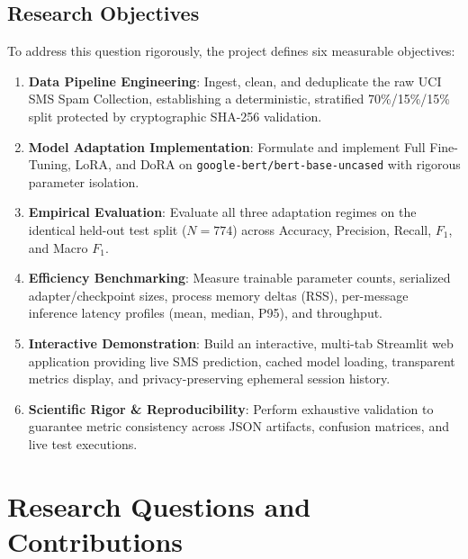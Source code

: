 \documentclass[conference]{IEEEtran}
\begin{document}
\subsection{Research Objectives}
To address this question rigorously, the project defines six measurable objectives:
\begin{enumerate}
    \item \textbf{Data Pipeline Engineering}: Ingest, clean, and deduplicate the raw UCI SMS Spam Collection, establishing a deterministic, stratified 70\%/15\%/15\% split protected by cryptographic SHA-256 validation.
    \item \textbf{Model Adaptation Implementation}: Formulate and implement Full Fine-Tuning, LoRA, and DoRA on \texttt{google-bert/bert-base-uncased} with rigorous parameter isolation.
    \item \textbf{Empirical Evaluation}: Evaluate all three adaptation regimes on the identical held-out test split ($N=774$) across Accuracy, Precision, Recall, $F_1$, and Macro $F_1$.
    \item \textbf{Efficiency Benchmarking}: Measure trainable parameter counts, serialized adapter/checkpoint sizes, process memory deltas (RSS), per-message inference latency profiles (mean, median, P95), and throughput.
    \item \textbf{Interactive Demonstration}: Build an interactive, multi-tab Streamlit web application providing live SMS prediction, cached model loading, transparent metrics display, and privacy-preserving ephemeral session history.
    \item \textbf{Scientific Rigor & Reproducibility}: Perform exhaustive validation to guarantee metric consistency across JSON artifacts, confusion matrices, and live test executions.
\end{enumerate}

\section{Research Questions and Contributions}
\label{sec:rq_contrib}
\end{document}

